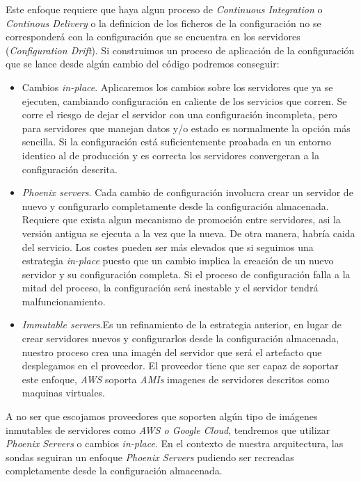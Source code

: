 Este enfoque requiere que haya algun proceso de \emph{Continuous Integration} o \emph{Continous Delivery} o la definicion de los ficheros
de la configuración no se corresponderá con la configuración que se encuentra en los servidores (\emph{Configuration Drift}). Si construimos 
un proceso de aplicación de la configuración que se lance desde algún cambio del código podremos conseguir:

\begin{itemize}
    \item Cambios \emph{in-place}. Aplicaremos los cambios sobre los servidores que ya se ejecuten, cambiando configuración en caliente de los servicios que corren.
    Se corre el riesgo de dejar el servidor con una configuración incompleta, pero para servidores que manejan datos y/o estado es normalmente la opción más sencilla. Si la configuración
    está suficientemente proabada en un entorno identico al de producción y es correcta los servidores convergeran a la configuración descrita. 
    \item \emph{Phoenix servers}. Cada cambio de configuración involucra crear un servidor de nuevo y configurarlo completamente desde la configuración almacenada.
    Requiere que exista algun mecanismo de promoción entre servidores, asi la versión antigua se ejecuta a la vez que la nueva. De otra manera, habría caida del servicio. Los costes pueden ser más elevados que si seguimos una estrategia \emph{in-place}
    puesto que un cambio implica la creación de un nuevo servidor y su configuración completa. Si el proceso de configuración falla a la mitad del proceso, la configuración será inestable y el servidor tendrá malfuncionamiento.
    \item \emph{Immutable servers}.Es un refinamiento de la estrategia anterior, en lugar de crear servidores nuevos y configurarlos desde la configuración almacenada, nuestro proceso crea una imagén del servidor que será el artefacto que desplegamos en el proveedor.
    El proveedor tiene que ser capaz de soportar este enfoque, \emph{AWS} soporta \emph{AMIs} imagenes de servidores descritos como maquinas virtuales.  
\end{itemize}

A no ser que escojamos proveedores que soporten algún tipo de imágenes inmutables de servidores como \emph{AWS o Google Cloud}, tendremos que utilizar \emph{Phoenix Servers} o cambios \emph{in-place}.
En el contexto de nuestra arquitectura, las sondas seguiran un enfoque \emph{Phoenix Servers} pudiendo ser recreadas completamente desde la configuración almacenada.

